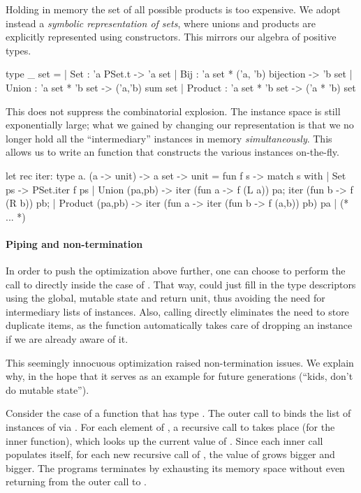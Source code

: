 Holding in memory the set of all possible products is too expensive. We adopt
instead a \emph{symbolic representation of sets}, where unions and products are
explicitly represented using constructors. This mirrors our algebra of positive
types.
%
\begin{ocamlcode}
type _ set =
  | Set   : 'a PSet.t -> 'a set
  | Bij   : 'a set * ('a, 'b) bijection -> 'b set
  | Union   : 'a set * 'b set -> ('a,'b) sum set
  | Product : 'a set * 'b set -> ('a * 'b) set
\end{ocamlcode}
%
This does not suppress the combinatorial explosion. The instance space is still
exponentially large; what we gained by changing our representation is that we
no longer hold all the ``intermediary'' instances in memory
\emph{simultaneously}. This allows us to write an  function that
constructs the various instances on-the-fly.
%
\begin{ocamlcode}
let rec iter: type a. (a -> unit) -> a set -> unit =
fun f s -> match s with
  | Set ps ->
      PSet.iter f ps
  | Union (pa,pb) ->
      iter (fun a -> f (L a)) pa;
      iter (fun b -> f (R b)) pb;
  | Product (pa,pb) ->
      iter (fun a -> iter (fun b -> f (a,b)) pb) pa
  | (* ... *)
\end{ocamlcode}
%

\paragraph{Piping and non-termination}
In order to push the optimization above further, one can choose to perform the
call to  directly inside the  case of .
That way,  could just fill in the type descriptors using the global,
mutable state and return unit, thus avoiding the need for intermediary lists of
instances. Also, calling  directly eliminates the need to store
duplicate items, as the function automatically takes care of dropping an
instance if we are already aware of it.

This seemingly innocuous optimization raised non-termination issues. We explain
why, in the hope that it serves as an example for future generations (``kids,
don't do mutable state'').

Consider the case of a function that has type . The outer call
to  binds the list of instances of  via . For each element of , a recursive call to  takes
place (for the inner  function), which looks up the current value
of . Since each inner call populates  itself, for
each new recursive call of , the value of  grows
bigger and bigger. The programs terminates by exhausting its memory space
without even returning from the outer call to .

